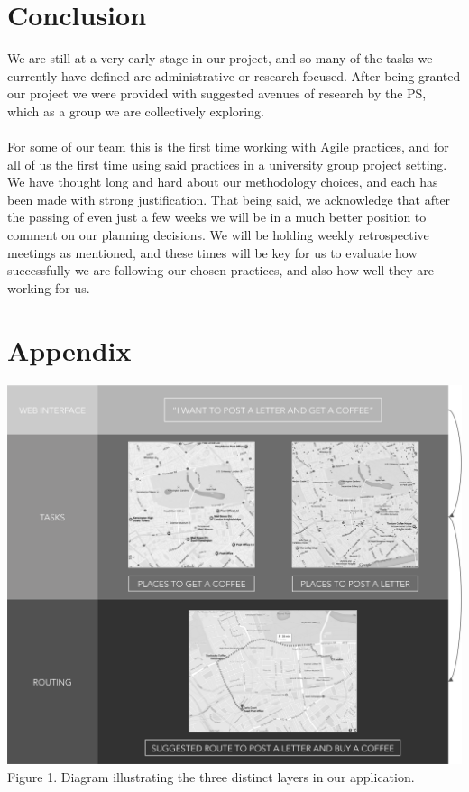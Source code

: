 \documentclass[10pt]{article}
\begin{document}
\section{Conclusion}
We are still at a very early stage in our project, and so many of the tasks we currently have defined are administrative or research-focused. After being granted our project we were provided with suggested avenues of research by the PS, which as a group we are collectively exploring.\\\\
For some of our team this is the first time working with Agile practices, and for all of us the first time using said practices in a university group project setting. We have thought long and hard about our methodology choices, and each has been made with strong justification. That being said, we acknowledge that after the passing of even just a few weeks we will be in a much better position to comment on our planning decisions. We will be holding weekly retrospective meetings as mentioned, and these times will be key for us to evaluate how successfully we are following our chosen practices, and also how well they are working for us.

\newpage
\section*{Appendix}
\begin{center}
\includegraphics[scale=0.4]{layer_diagram.png}\\
Figure 1. Diagram illustrating the three distinct layers in our application.
\end{center}
\end{document}
